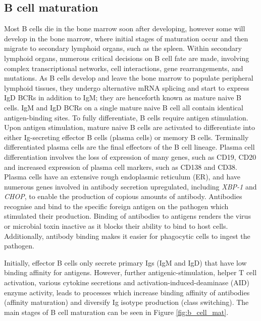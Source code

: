 \subsection{B cell maturation}
Most B cells die in the bone marrow soon after developing, however some will develop in the bone marrow, where initial stages of maturation occur and then migrate to secondary lymphoid organs, such as the spleen.
Within secondary lymphoid organs, numerous critical decisions on B cell fate are made, involving complex transcriptional networks, cell interactions, gene rearrangements, and mutations\cite{roth2014tracking, jourdan2011characterization}.
As B cells develop and leave the bone marrow to populate peripheral lymphoid tissues, they undergo alternative mRNA splicing and start to express IgD BCRs in addition to IgM; they are henceforth known as mature naive B cells.
IgM and IgD BCRs on a single mature naive B cell all contain identical antigen-binding sites.
To fully differentiate, B cells require antigen stimulation.
Upon antigen stimulation, mature naive B cells are activated to differentiate into either Ig-secreting effector B cells (plasma cells) or memory B cells.
Terminally differentiated plasma cells are the final effectors of the B cell lineage.
Plasma cell differentiation involves the loss of expression of many genes, such as CD19, CD20 and increased expression of plasma cell markers, such as CD138 and CD38.
Plasma cells have an extensive rough endoplasmic reticulum (ER), and have numerous genes involved in antibody secretion upregulated, including \textit{XBP-1} and \textit{CHOP}, to enable the production of copious amounts of antibody\cite{shapiro2004plasma}.
Antibodies recognise and bind to the specific foreign antigen on the pathogen which stimulated their production.
Binding of antibodies to antigens renders the virus or microbial toxin inactive as it blocks their ability to bind to host cells.
Additionally, antibody binding makes it easier for phagocytic cells to ingest the pathogen\cite{alberts2007molecularimmune}.

Initially, effector B cells only secrete primary Igs (IgM and IgD) that have low binding affinity for antigens.
However, further antigenic-stimulation, helper T cell activation, various cytokine secretions and activation-induced-deaminase (AID) enzyme activity, leads to processes which increase binding affinity of antibodies (affinity maturation) and diversify Ig isotype production (class switching).
The main stages of B cell maturation can be seen in Figure \ref{fig:b_cell_mat}.

